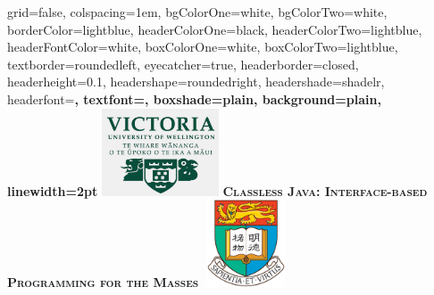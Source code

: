 \documentclass[portrait,final,a0paper,fontscale=0.277]{baposter}
\begin{document}
\begin{poster}%
  {
  grid=false,
  colspacing=1em,
  bgColorOne=white,
  bgColorTwo=white,
  borderColor=lightblue,
  headerColorOne=black,
  headerColorTwo=lightblue,
  headerFontColor=white,
  boxColorOne=white,
  boxColorTwo=lightblue,
  textborder=roundedleft,
  eyecatcher=true,
  headerborder=closed,
  headerheight=0.1\textheight,
  headershape=roundedright,
  headershade=shadelr,
  headerfont=\Large\bf\textsc, %
  textfont={\setlength{\parindent}{1.5em}},
  boxshade=plain,
  background=plain,
  linewidth=2pt
  }
  {\includegraphics[height=7em]{pdfs/vuw.png}}
  {\bf\textsc{Classless Java: Interface-based Programming for the Masses}\vspace{0.1em}}
  {}
  {%
    \includegraphics[width=7em,height=7em]{pdfs/hku.png}
  }








    \newcommand{\colouredcircle}{%
      \tikz{\useasboundingbox (-0.2em,-0.32em) rectangle(0.2em,0.32em); \draw[draw=black,fill=lightblue,line width=0.03em] (0,0) circle(0.18em);}}


\end{poster}
\end{document}

